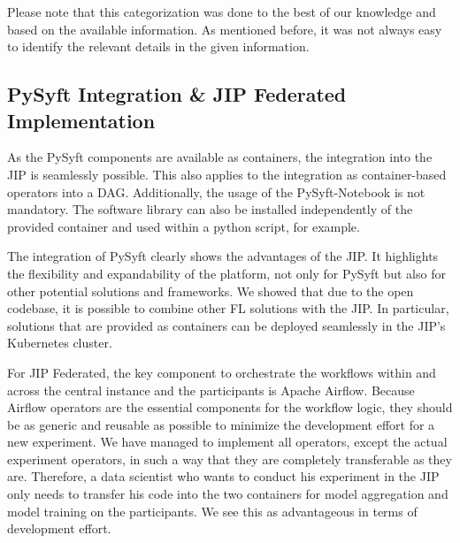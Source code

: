 Please note that this categorization was done to the best of our knowledge and based on the available information. As mentioned before, it was not always easy to identify the relevant details in the given information.





\subsection{PySyft Integration \& JIP Federated Implementation}
\label{subsec:DiscussionImplementation}
As the PySyft components are available as containers, the integration into the JIP is seamlessly possible. This also applies to the integration as container-based operators into a DAG.
Additionally, the usage of the PySyft-Notebook is not mandatory. The software library can also be installed independently of the provided container and used within a python script, for example.

The integration of PySyft clearly shows the advantages of the JIP. 
It highlights the flexibility and expandability of the platform, not only for PySyft but also for other potential solutions and frameworks. We showed that due to the open codebase, it is possible to combine other FL solutions with the JIP. In particular, solutions that are provided as containers can be deployed seamlessly in the JIP's Kubernetes cluster.

For JIP Federated, the key component to orchestrate the workflows within and across the central instance and the participants is Apache Airflow.
Because Airflow operators are the essential components for the workflow logic, they should be as generic and reusable as possible to minimize the development effort for a new experiment. We have managed to implement all operators, except the actual experiment operators, in such a way that they are completely transferable as they are. Therefore, a data scientist who wants to conduct his experiment in the JIP only needs to transfer his code into the two containers for model aggregation and model training on the participants. We see this as advantageous in terms of development effort.

